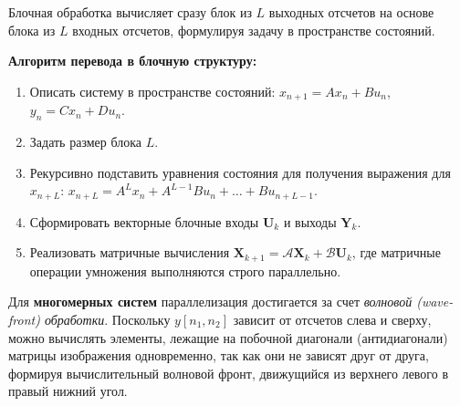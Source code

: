 \documentclass[12pt,a4paper]{article}
\begin{document}
Блочная обработка вычисляет сразу блок из $L$ выходных отсчетов на основе блока из $L$ входных отсчетов, формулируя задачу в пространстве состояний.

\textbf{Алгоритм перевода в блочную структуру:}
\begin{enumerate}[label=\textbf{Шаг \arabic*.}, leftmargin=*]
    \item Описать систему в пространстве состояний:
    $x_{n+1} = A x_n + B u_n$, \quad $y_n = C x_n + D u_n$.
    \item Задать размер блока $L$.
    \item Рекурсивно подставить уравнения состояния для получения выражения для $x_{n+L}$:
    $x_{n+L} = A^L x_n + A^{L-1}B u_n + \dots + B u_{n+L-1}$.
    \item Сформировать векторные блочные входы $\mathbf{U}_k$ и выходы $\mathbf{Y}_k$.
    \item Реализовать матричные вычисления $\mathbf{X}_{k+1} = \mathcal{A} \mathbf{X}_k + \mathcal{B} \mathbf{U}_k$, где матричные операции умножения выполняются строго параллельно.
\end{enumerate}

Для \textbf{многомерных систем} параллелизация достигается за счет \textit{волновой (wave-front) обработки}. Поскольку $y[n_1, n_2]$ зависит от отсчетов слева и сверху, можно вычислять элементы, лежащие на побочной диагонали (антидиагонали) матрицы изображения одновременно, так как они не зависят друг от друга, формируя вычислительный волновой фронт, движущийся из верхнего левого в правый нижний угол.
\end{document}
